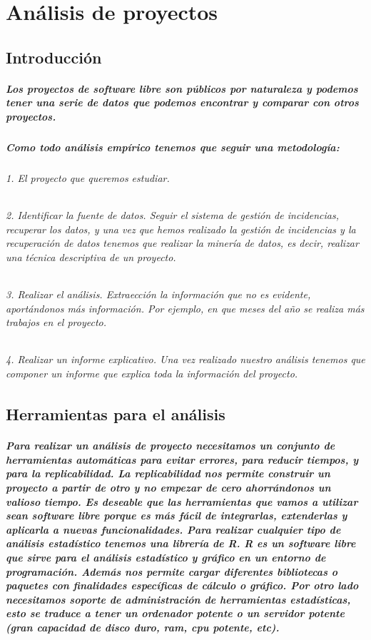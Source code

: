\chapter{An\'alisis de proyectos}
\label{CHAP6:Analysis}
\section{Introducci\'on}
\paragraph{Los proyectos de software libre son p\'ublicos por naturaleza y podemos tener una serie de datos que podemos encontrar y comparar con otros proyectos.}
\paragraph{Como todo an\'alisis emp\'irico tenemos que seguir una metodolog\'ia:}
\subparagraph{1. El proyecto que queremos estudiar.}
\subparagraph{2. Identificar la fuente de datos. Seguir el sistema de gesti\'on de incidencias, recuperar los datos, y una vez que hemos realizado la gesti\'on de incidencias y la recuperaci\'on de datos tenemos que realizar la miner\'ia de datos, es decir, realizar una t\'ecnica descriptiva de un proyecto.}
\subparagraph{3. Realizar el an\'alisis. Extraecci\'on la informaci\'on que no es evidente, aport\'andonos m\'as informaci\'on. Por ejemplo, en que meses del a\~no se realiza m\'as trabajos en el proyecto.}
\subparagraph{4. Realizar un informe explicativo. Una vez realizado nuestro an\'alisis tenemos que componer un informe que explica toda la informaci\'on del proyecto.}
\section{Herramientas para el an\'alisis}
\paragraph{Para realizar un an\'alisis de proyecto necesitamos un conjunto de herramientas autom\'aticas para evitar errores, para reducir tiempos, y para la replicabilidad. La replicabilidad nos permite construir un proyecto a partir de otro y no empezar de cero ahorr\'andonos un valioso tiempo. 
Es deseable que las herramientas que vamos a utilizar sean software libre porque es m\'as f\'acil de integrarlas, extenderlas y aplicarla a nuevas funcionalidades. 
Para realizar cualquier tipo de an\'alisis estad\'istico tenemos una librer\'ia de R. R es un software libre que sirve para el análisis estad\'istico y gr\'afico en un entorno de programaci\'on. Adem\'as nos permite cargar diferentes bibliotecas o paquetes con finalidades espec\'ificas de c\'alculo o gr\'afico. 
Por otro lado necesitamos soporte de administraci\'on de herramientas estad\'isticas, esto se traduce a tener un ordenador potente o un servidor potente (gran capacidad de disco duro, ram, cpu potente, etc).}
